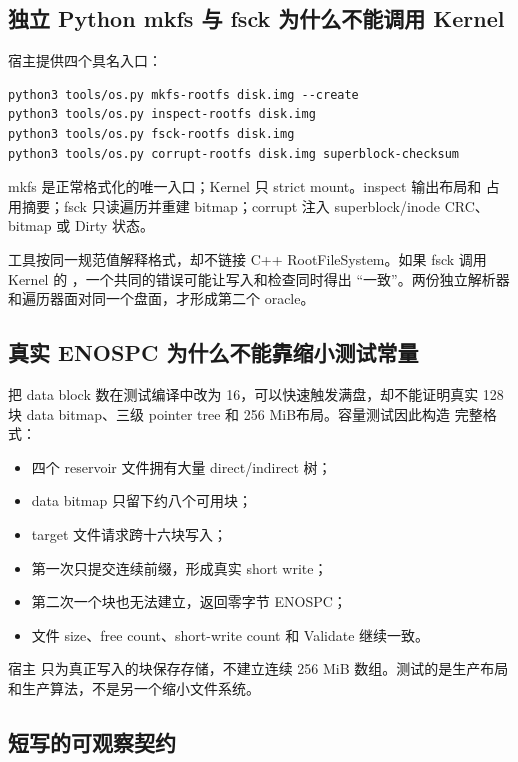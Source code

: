 \subsection{独立 Python mkfs 与 fsck 为什么不能调用 Kernel}

宿主提供四个具名入口：

\begin{lstlisting}[caption={rootfs v2 独立工具}]
python3 tools/os.py mkfs-rootfs disk.img --create
python3 tools/os.py inspect-rootfs disk.img
python3 tools/os.py fsck-rootfs disk.img
python3 tools/os.py corrupt-rootfs disk.img superblock-checksum
\end{lstlisting}

mkfs 是正常格式化的唯一入口；Kernel 只 strict mount。inspect 输出布局和
占用摘要；fsck 只读遍历并重建 bitmap；corrupt 注入 superblock/inode CRC、
bitmap 或 Dirty 状态。

工具按同一规范值解释格式，却不链接 C++ RootFileSystem。如果 fsck 调用
Kernel 的 ，一个共同的错误可能让写入和检查同时得出
“一致”。两份独立解析器和遍历器面对同一个盘面，才形成第二个 oracle。

\subsection{真实 ENOSPC 为什么不能靠缩小测试常量}

把 data block 数在测试编译中改为 16，可以快速触发满盘，却不能证明真实
128 块 data bitmap、三级 pointer tree 和 256 MiB布局。容量测试因此构造
完整格式：

\begin{itemize}
  \item 四个 reservoir 文件拥有大量 direct/indirect 树；
  \item data bitmap 只留下约八个可用块；
  \item target 文件请求跨十六块写入；
  \item 第一次只提交连续前缀，形成真实 short write；
  \item 第二次一个块也无法建立，返回零字节 ENOSPC；
  \item 文件 size、free count、short-write count 和 Validate 继续一致。
\end{itemize}

宿主  只为真正写入的块保存存储，不建立连续
256 MiB 数组。测试的是生产布局和生产算法，不是另一个缩小文件系统。

\subsection{短写的可观察契约}

